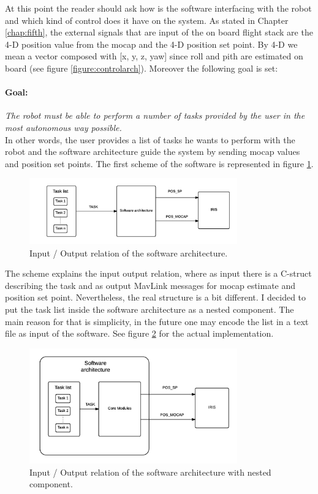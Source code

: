 At this point the reader should ask how is the software interfacing with the robot and which kind of control does it have on the system. As stated in Chapter \ref{chap:fifth}, the external signals that are input of the on board flight stack are the 4-D position value from the mocap and the 4-D position set point. By 4-D we mean a vector composed with [x, y, z, yaw] since roll and pith are estimated on board (see figure \ref{figure:controlarch}). Moreover the following goal is set:
\paragraph{Goal:} \textit{The robot must be able to perform a number of tasks provided by the user in the most autonomous way possible.} \\

\noindent
In other words, the user provides a list of tasks he wants to perform with the robot and the software architecture guide the system by sending mocap values and position set points. The first scheme of the software is represented in figure \ref{figure:inout}. 
\begin{figure}[h]
\centering
 \includegraphics[width=0.8\textwidth]{first_arch.png}
 \caption[In-out relation]{Input / Output relation of the software architecture.}
 \label{figure:inout}
\end{figure}
The scheme explains the input output relation, where as input there is a C-struct describing the task and as output MavLink messages for mocap estimate and position set point. Nevertheless, the real structure is a bit different. I decided to put the task list inside the software architecture as a nested component. The main reason for that is simplicity, in the future one may encode the list in a text file as input of the software. See figure \ref{figure:inoutnest} for the actual implementation.

\begin{figure}[h]
\centering
 \includegraphics[width=0.8\textwidth]{nested_arch.png}
 \caption[In-out relation for the nested arch]{Input / Output relation of the software architecture with nested component.}
 \label{figure:inoutnest}
\end{figure}

